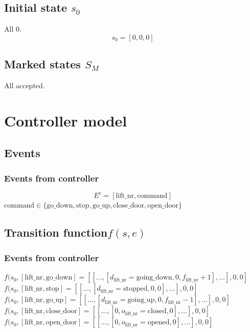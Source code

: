\documentclass[12pt]{article}
\begin{document}
\subsection{Initial state \(s_0\)}
All 0.
\[
  s_0 = [0,0,0]
\]



\subsection{Marked states \(S_M\)}
All accepted.

\section{Controller model}

\subsection{Events}
\subsubsection{Events from controller}
\[ E^c = [\text{lift\_nr}, \text{command}] \]
\(\text{command} \in \{\text{go\_down},\text{stop},\text{go\_up},\text{close\_door},\text{open\_door}\}\)

\subsection{Transition function\(f(s,e)\)}



\subsubsection{Events from controller}
\(
  f(s_0,[\text{lift\_nr},\text{go\_down}] =
  [[...,[d_\text{lift\_nr}=\text{going\_down},0,f_\text{lift\_nr}+1],...],0,0]
\)\\
\(
  f(s_0,[\text{lift\_nr},\text{stop}] =
  [[...,[d_\text{lift\_nr}=\text{stopped},0,0],...],0,0]
\)\\
\(
  f(s_0,[\text{lift\_nr},\text{go\_up}] =
  [[...,[d_\text{lift\_nr}=\text{going\_up},0,f_\text{lift\_nr}-1],...],0,0]
\)\\
\(
  f(s_0,[\text{lift\_nr},\text{close\_door}] =
  [[...,[0,o_\text{lift\_nr}=\text{closed},0],...],0,0]
\)\\
\(
  f(s_0,[\text{lift\_nr},\text{open\_door}] =
  [[...,[0,o_\text{lift\_nr}=\text{opened},0],...],0,0]
\)
\end{document}
